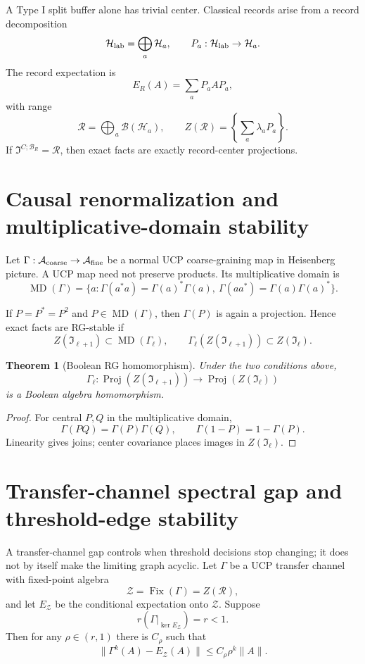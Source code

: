 \documentclass[11pt]{article}
\newtheorem{theorem}{Theorem}[section]
\newcommand{\A}{\mathcal A}
\newcommand{\B}{\mathcal B}
\newcommand{\Hh}{\mathcal H}
\newcommand{\I}{\mathfrak I}
\newcommand{\R}{\mathcal R}
\newcommand{\Z}{\mathcal Z}
\DeclareMathOperator{\Proj}{Proj}
\newcommand{\MD}{\operatorname{MD}}
\newcommand{\Fix}{\operatorname{Fix}}
\begin{document}
A Type I split buffer alone has trivial center.  Classical records arise from a record decomposition
\[
\Hh_{\rm lab}=\bigoplus_a \Hh_a,
\qquad P_a:\Hh_{\rm lab}\to\Hh_a.
\]
The record expectation is
\[
E_R(A)=\sum_a P_aAP_a,
\]
with range
\[
\R=\bigoplus_a\mathcal B(\Hh_a),
\qquad Z(\R)=\left\{\sum_a\lambda_aP_a\right\}.
\]
If $\I^{C;\B_R}=\R$, then exact facts are exactly record-center projections.

\section{Causal renormalization and multiplicative-domain stability}

Let $\Gamma:\A_{\rm coarse}\to\A_{\rm fine}$ be a normal UCP coarse-graining map in Heisenberg picture.  A UCP map need not preserve products.  Its multiplicative domain is
\[
\MD(\Gamma)=\{a:\Gamma(a^*a)=\Gamma(a)^*\Gamma(a),\ \Gamma(aa^*)=\Gamma(a)\Gamma(a)^*\}.
\]

If $P=P^*=P^2$ and $P\in\MD(\Gamma)$, then $\Gamma(P)$ is again a projection.  Hence exact facts are RG-stable if
\[
Z(\I_{\ell+1})\subset\MD(\Gamma_\ell),
\qquad
\Gamma_\ell(Z(\I_{\ell+1}))\subset Z(\I_\ell).
\]

\begin{theorem}[Boolean RG homomorphism]
Under the two conditions above,
\[
\Gamma_\ell:\Proj(Z(\I_{\ell+1}))\to\Proj(Z(\I_\ell))
\]
is a Boolean algebra homomorphism.
\end{theorem}

\begin{proof}
For central $P,Q$ in the multiplicative domain,
\[
\Gamma(PQ)=\Gamma(P)\Gamma(Q),\qquad \Gamma(1-P)=1-\Gamma(P).
\]
Linearity gives joins; center covariance places images in $Z(\I_\ell)$.
\end{proof}

\section{Transfer-channel spectral gap and threshold-edge stability}

A transfer-channel gap controls when threshold decisions stop changing; it
does not by itself make the limiting graph acyclic.  Let $\Gamma$ be a UCP
transfer channel with fixed-point algebra
\[
\Z=\Fix(\Gamma)=Z(\R),
\]
and let $E_\Z$ be the conditional expectation onto $\Z$.  Suppose
\[
r(\Gamma|_{\ker E_\Z})=r<1.
\]
Then for any $\rho\in(r,1)$ there is $C_\rho$ such that
\[
\boxed{\|\Gamma^k(A)-E_\Z(A)\|\le C_\rho\rho^k\|A\|.}
\]
\end{document}
